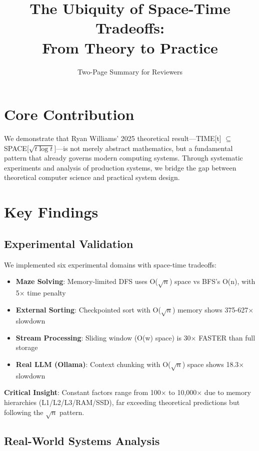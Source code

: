 \documentclass[11pt,twocolumn]{article}
\title{\vspace{-15mm}\textbf{The Ubiquity of Space-Time Tradeoffs:\\From Theory to Practice}\vspace{-5mm}}
\author{Two-Page Summary for Reviewers}
\date{}
\begin{document}
\maketitle
\vspace{-10mm}

\section{Core Contribution}
We demonstrate that Ryan Williams' 2025 theoretical result---TIME[t] $\subseteq$ SPACE[$\sqrt{t \log t}$]---is not merely abstract mathematics, but a fundamental pattern that already governs modern computing systems. Through systematic experiments and analysis of production systems, we bridge the gap between theoretical computer science and practical system design.

\section{Key Findings}

\subsection{Experimental Validation}
We implemented six experimental domains with space-time tradeoffs:

\begin{itemize}
\item \textbf{Maze Solving}: Memory-limited DFS uses O($\sqrt{n}$) space vs BFS's O(n), with 5$\times$ time penalty
\item \textbf{External Sorting}: Checkpointed sort with O($\sqrt{n}$) memory shows 375-627$\times$ slowdown  
\item \textbf{Stream Processing}: Sliding window (O(w) space) is 30$\times$ FASTER than full storage
\item \textbf{Real LLM (Ollama)}: Context chunking with O($\sqrt{n}$) space shows 18.3$\times$ slowdown
\end{itemize}

\textbf{Critical Insight}: Constant factors range from 100$\times$ to 10,000$\times$ due to memory hierarchies (L1/L2/L3/RAM/SSD), far exceeding theoretical predictions but following the $\sqrt{n}$ pattern.

\subsection{Real-World Systems Analysis}
\end{document}
